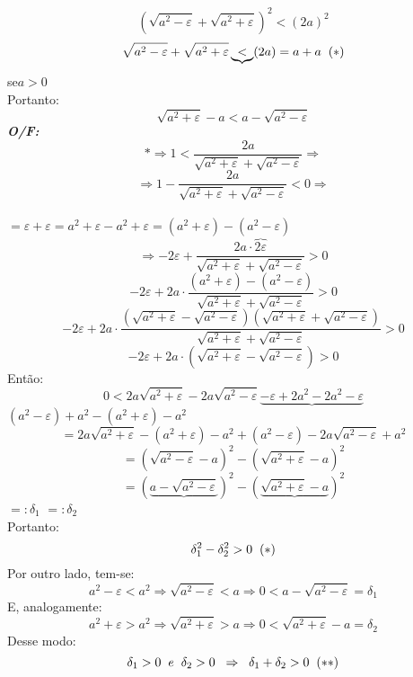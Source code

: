 \documentclass[12pt]{article}
\begin{document}
\[\left(\sqrt{a^2-\varepsilon}+\sqrt{a^2+\varepsilon}\right)^2<(2a)^2\]
\[\sqrt{a^2-\varepsilon}+\sqrt{a^2+\varepsilon}\underbrace{<}(2a)=a+a\hspace{0.2cm}(\ast)\]
\hspace{6.5cm} se\hspace{0.2cm}\(a>0\)\\
Portanto:
\[\sqrt{a^2+\varepsilon}-a<a-\sqrt{a^2-\varepsilon}\]
\newpage
\textbf{\textit{O/F:}} 
\[\ast\Rightarrow 1<\frac{2a}{\sqrt{a^2+\varepsilon}+\sqrt{a^2-\varepsilon}}\Rightarrow \]
\[\Rightarrow 1-\frac{2a}{\sqrt{a^2+\varepsilon}+\sqrt{a^2-\varepsilon}}<0\Rightarrow \]\\
\vspace{0.5cm}
\hspace{7.2cm} \footnotesize{\(=\varepsilon+\varepsilon=a^2+\varepsilon-a^2+\varepsilon=(a^2+\varepsilon)-(a^2-\varepsilon)\)}
\normalsize{}
\vspace{-0.8cm}\\
\[\Rightarrow-2\varepsilon+\frac{2a\cdot\overbrace{2\varepsilon}}{\sqrt{a^2+\varepsilon}+\sqrt{a^2-\varepsilon}}>0\]
\[-2\varepsilon+2a\cdot\frac{(a^2+\varepsilon)-(a^2-\varepsilon)}{\sqrt{a^2+\varepsilon}+\sqrt{a^2-\varepsilon}}>0\]
\[-2\varepsilon+2a\cdot\frac{(\sqrt{a^2+\varepsilon}-\sqrt{a^2-\varepsilon})(\sqrt{a^2+\varepsilon}+\sqrt{a^2-\varepsilon})}{\sqrt{a^2+\varepsilon}+\sqrt{a^2-\varepsilon}}>0\]
\[-2\varepsilon+2a\cdot(\sqrt{a^2+\varepsilon}-\sqrt{a^2-\varepsilon})>0\]
Então:
\[0<2a\sqrt{a^2+\varepsilon}-2a\sqrt{a^2-\varepsilon}\underbrace{-\varepsilon+2a^2-2a^2-\varepsilon}\]
\hspace{7cm} \((a^2-\varepsilon)+a^2-(a^2+\varepsilon)-a^2\)\\
\[=2a\sqrt{a^2+\varepsilon}-(a^2+\varepsilon)-a^2+(a^2-\varepsilon)-2a\sqrt{a^2-\varepsilon}+a^2\]
\[=(\sqrt{a^2-\varepsilon}-a)^2-(\sqrt{a^2+\varepsilon}-a)^2\]
\[=(\underbrace{a-\sqrt{a^2-\varepsilon}})^2-(\underbrace{\sqrt{a^2+\varepsilon}-a})^2\]
\hspace{5cm} \(=:\delta_1 \)\hspace{2.2cm} \(=:\delta_2 \)\\
Portanto:
\[\delta_1^2-\delta_2^2>0 \hspace{0.2cm}(\ast)\]
\newpage
Por outro lado, tem-se:
\[a^2-\varepsilon<a^2\Rightarrow\sqrt{a^2-\varepsilon}<a\Rightarrow 0<a-\sqrt{a^2-\varepsilon}=\delta_1\]
E, analogamente:
\[a^2+\varepsilon>a^2\Rightarrow\sqrt{a^2+\varepsilon}>a\Rightarrow 0<\sqrt{a^2+\varepsilon}-a=\delta_2\]
Desse modo:
\[\delta_1>0\hspace{0.2cm} e \hspace{0.2cm} \delta_2>0\hspace{0.2cm}\Rightarrow\hspace{0.2cm}\delta_1+\delta_2>0\hspace{0.2cm}(\ast\ast)\]
\end{document}
